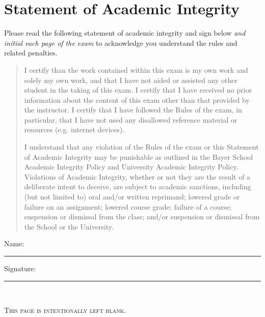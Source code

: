 		\section*{Statement of Academic Integrity}
		Please read the following statement of academic integrity and sign below \emph{and initial each page of the exam} to acknowledge you understand the rules and related penalties.
		\begin{quote}
			I certify than the work contained within this exam is my own work and solely my own work, and that I have not aided or assisted any other student in the taking of this exam.  I certify that I have received no prior information about the content of this exam other than that provided by the instructor.  I certify that I have followed the Rules of the exam, in particular, that I have not used any disallowed reference material or resources (e.g. internet devices).

			I understand that any violation of the Rules of the exam or this Statement of Academic Integrity may be punishable as outlined in the Bayer School Academic Integrity Policy and University Academic Integrity Policy.  Violations of Academic Integrity, whether or not they are the result of a deliberate intent to deceive, are subject to academic sanctions, including (but not limited to) oral and/or written reprimand; lowered grade or failure on an assignment; lowered course grade; failure of a course; suspension or dismissal from the class; and/or suspension or dismissal from the School or the University.
		\end{quote}
		\vspace{0.25in}
		\begin{center}
			Name: \rule{2.0in}{1pt} \hspace{1cm} Signature: \rule{2.0in}{1pt}\\
		\end{center}
    \newpage{}
    \begin{center}
        \textsc{This page is intentionally left blank.}
    \end{center}
	\newpage{}

\fi
